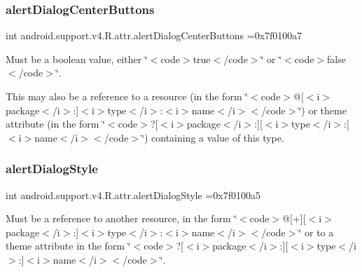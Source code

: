 \subsubsection{\texorpdfstring{alert\+Dialog\+Center\+Buttons}{alertDialogCenterButtons}}
{\footnotesize\ttfamily int android.\+support.\+v4.\+R.\+attr.\+alert\+Dialog\+Center\+Buttons =0x7f0100a7\hspace{0.3cm}{\ttfamily [static]}}

Must be a boolean value, either \char`\"{}$<$code$>$true$<$/code$>$\char`\"{} or \char`\"{}$<$code$>$false$<$/code$>$\char`\"{}. 

This may also be a reference to a resource (in the form \char`\"{}$<$code$>$@\mbox{[}$<$i$>$package$<$/i$>$\+:\mbox{]}$<$i$>$type$<$/i$>$\+:$<$i$>$name$<$/i$>$$<$/code$>$\char`\"{}) or theme attribute (in the form \char`\"{}$<$code$>$?\mbox{[}$<$i$>$package$<$/i$>$\+:\mbox{]}\mbox{[}$<$i$>$type$<$/i$>$\+:\mbox{]}$<$i$>$name$<$/i$>$$<$/code$>$\char`\"{}) containing a value of this type. \mbox{\label{classandroid_1_1support_1_1v4_1_1R_1_1attr_aa29cc93214bbf145ac5599924699a1dc}} 
\subsubsection{\texorpdfstring{alert\+Dialog\+Style}{alertDialogStyle}}
{\footnotesize\ttfamily int android.\+support.\+v4.\+R.\+attr.\+alert\+Dialog\+Style =0x7f0100a5\hspace{0.3cm}{\ttfamily [static]}}

Must be a reference to another resource, in the form \char`\"{}$<$code$>$@\mbox{[}+\mbox{]}\mbox{[}$<$i$>$package$<$/i$>$\+:\mbox{]}$<$i$>$type$<$/i$>$\+:$<$i$>$name$<$/i$>$$<$/code$>$\char`\"{} or to a theme attribute in the form \char`\"{}$<$code$>$?\mbox{[}$<$i$>$package$<$/i$>$\+:\mbox{]}\mbox{[}$<$i$>$type$<$/i$>$\+:\mbox{]}$<$i$>$name$<$/i$>$$<$/code$>$\char`\"{}. \mbox{\label{classandroid_1_1support_1_1v4_1_1R_1_1attr_a3e3e081108a98146034d802e2e42bb9b}} 
